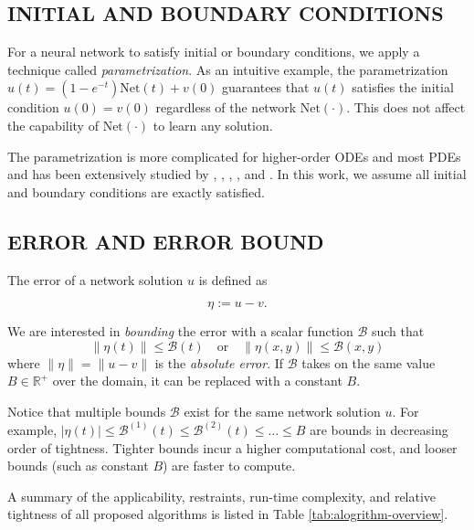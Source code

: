 \documentclass[accepted]{uai2023}
\newcommand{\Err}{\eta}
\newcommand{\Bound}{\mathcal{B}}
\newcommand{\Net}{\mathrm{Net}}
\begin{document}
\subsection{INITIAL AND BOUNDARY CONDITIONS}\label{section:initial-and-boundary-conditions}
    For a neural network to satisfy initial or boundary conditions, we apply a technique called \textit{parametrization}. 
    As an intuitive example, the parametrization $u(t) = (1 - e^{-t}) \Net(t) + v(0)$ guarantees that $u(t)$ satisfies the initial condition $u(0)=v(0)$ regardless of the network $\Net(\cdot)$.
    This does not affect the capability of $\Net(\cdot)$ to learn any solution.

    The parametrization is more complicated for higher-order ODEs and most PDEs and has been extensively studied by \cite{lagaris1998artificial}, \cite{lagaris2000neural}, \cite{mcfall2009artificial}, \cite{lagari2020systematic}, and \cite{sukumar2021exact}.
    In this work, we assume all initial and boundary conditions are exactly satisfied.

\subsection{ERROR AND ERROR BOUND}
    The error of a network solution $u$ is defined as 
    {
        \small
        \begin{equation}
            \Err := u - v.
        \end{equation}

    }
    We are interested in \textit{bounding} the error with a scalar function $\Bound$ such that 
    {
        \small
        \begin{equation}
            \|\Err(t)\| \leq \Bound(t) \quad \text{or} \quad \|\Err(x, y)\| \leq \Bound(x, y)
        \end{equation}
    }
    where $\|\Err\| = \|u - v\|$ is the \textit{absolute error}.
    If $\Bound$ takes on the same value $B \in \mathbb{R}^{+}$ over the domain, it can be replaced with a constant $B$.

    Notice that multiple bounds $\Bound$ exist for the same network solution $u$.
    For example, $|\Err(t)| \leq \Bound^{(1)}(t) \leq  \Bound^{(2)}(t) \leq \dots \leq B$ are bounds in decreasing order of tightness. Tighter bounds incur a higher computational cost, and looser bounds (such as constant $B$) are faster to compute.

    A summary of the applicability, restraints, run-time complexity, and relative tightness of all proposed algorithms is listed in Table \ref{tab:alogrithm-overview}.
\end{document}

